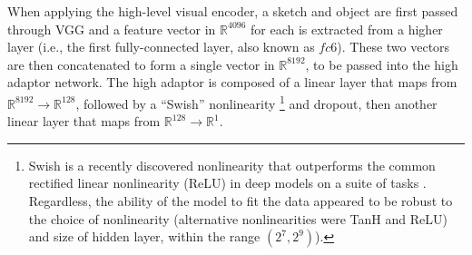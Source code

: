 \documentclass[9pt,twocolumn,twoside]{pnas-new}
\begin{document}
{%


When applying the high-level visual encoder, a sketch and object are first passed through VGG and a feature vector in $\mathbb{R}^{4096}$ for each is extracted from a higher layer (i.e., the first fully-connected layer, also known as $fc6$). These two vectors are then concatenated to form a single vector in $\mathbb{R}^{8192}$, to be passed into the high adaptor network. 
The high adaptor is composed of a linear layer that maps from $\mathbb{R}^{8192} \rightarrow \mathbb{R}^{128}$, followed by a ``Swish'' nonlinearity \footnote{Swish is a recently discovered nonlinearity that outperforms the common rectified linear nonlinearity (ReLU) in deep models on a suite of tasks \cite[]{ramachandran2018searching}. Regardless, the ability of the model to fit the data appeared to be robust to the choice of nonlinearity (alternative nonlinearities were TanH and ReLU) and size of hidden layer, within the range $(2^{7},2^{9})$).}  and dropout, then another linear layer that maps from $\mathbb{R}^{128} \rightarrow \mathbb{R}^{1}$.

}
\end{document}
